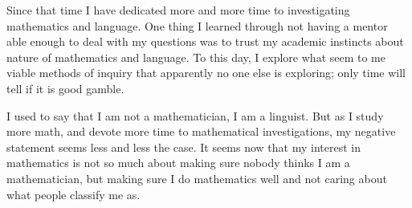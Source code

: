 Since that time I have dedicated more and more time to investigating mathematics and language. One thing I learned through not having a mentor able enough to deal with my questions was to trust my academic instincts about nature of mathematics and language. To this day, I explore what seem to me viable methods of inquiry that apparently no one else is exploring; only time will tell if it is good gamble.

I used to say that I am not a mathematician, I am a linguist. But as I study more math, and devote more time to mathematical investigations, my negative statement seems less and less the case. It seems now that my interest in mathematics is not so much about making sure nobody thinks I am a mathematician, but making sure I do mathematics well and not caring about what people classify me as.
